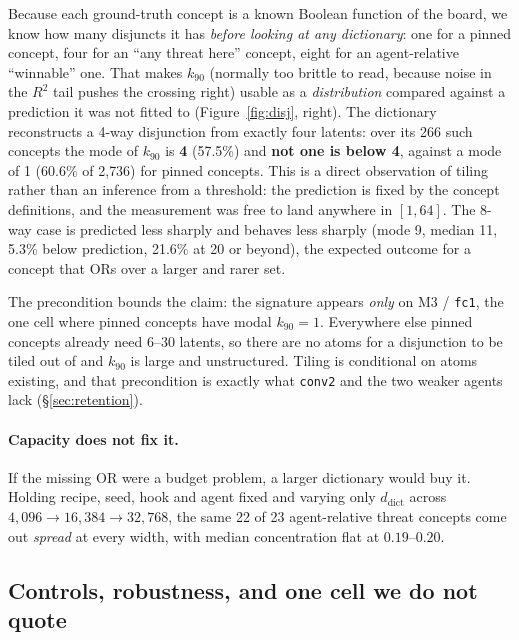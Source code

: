 \documentclass{article}
\begin{document}
Because each ground-truth concept is a known Boolean function of the board, we
know how many disjuncts it has \emph{before looking at any dictionary}: one for
a pinned concept, four for an ``any threat here'' concept, eight for an
agent-relative ``winnable'' one. That makes $k_{90}$ (normally too brittle to
read, because noise in the $R^2$ tail pushes the crossing right) usable as a
\emph{distribution} compared against a prediction it was not fitted to
(Figure~\ref{fig:disj}, right). The dictionary reconstructs a 4-way disjunction
from exactly four latents: over
its 266 such concepts the mode of $k_{90}$ is \textbf{4} (57.5\%) and
\textbf{not one is below 4}, against a mode of 1 (60.6\% of 2{,}736) for pinned
concepts. This is a direct observation of tiling rather than an inference from a
threshold: the prediction is fixed by the concept definitions, and the
measurement was free to land anywhere in $[1,64]$. The 8-way case is predicted
less sharply and behaves less sharply (mode 9, median 11, 5.3\% below
prediction, 21.6\% at 20 or beyond), the expected outcome for a concept that ORs
over a larger and rarer set.

The precondition bounds the claim: the signature appears \emph{only} on M3 /
\texttt{fc1}, the one cell where pinned concepts have modal $k_{90} = 1$.
Everywhere else pinned concepts already need 6--30 latents, so there are no
atoms for a disjunction to be tiled out of and $k_{90}$ is large and
unstructured. Tiling is conditional on atoms existing, and that precondition is
exactly what \texttt{conv2} and the two weaker agents lack
(\S\ref{sec:retention}).

\paragraph{Capacity does not fix it.} If the missing OR were a budget problem, a
larger dictionary would buy it. Holding recipe, seed, hook and agent fixed and
varying only $d_{\text{dict}}$ across $4{,}096 \to 16{,}384 \to 32{,}768$, the
same 22 of 23 agent-relative threat concepts come out \emph{spread} at every
width, with median concentration flat at $0.19$--$0.20$.

\subsection{Controls, robustness, and one cell we do not quote}
\label{sec:robustness}
\end{document}
